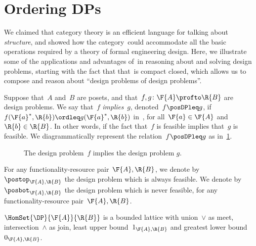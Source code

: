 \section{Ordering DPs}\label{sec:ordering-order}
We claimed that category theory is an efficient language for talking about \emph{structure}, and showed how the category~\DP could accommodate all the basic operations required by a theory of formal engineering design. Here, we illustrate some of the applications and advantages of~\DP in reasoning about and solving design problems, starting with the fact that that~\DP is compact closed, which allows us to compose and reason about ``design problems of design problems''.

\begin{definition}[Order on~\DP]
  \label{def:DP_loc_pos}

  Suppose that~$A$ and~$B$ are posets, and that~$f,g \colon \F{A} \profto \R{B}$ are design problems. We say that~$f$ \emph{implies}~$g$, denoted~$f \posDPleq g$, if~$f(\F{a}^*,\R{b}) \ordleq g(\F{a}^*,\R{b} )$ in~\Bool, for all~$\F{a} \in \F{A}$
  and~$\R{b} \in \R{B}$. In other words, if the fact that~$f$ is feasible implies that~$g$ is feasible. We diagrammatically represent the relation~$f \posDPleq g$ as in~\cref{fig:dpimplies}.
\end{definition}

\begin{figure}[h!]
  \begin{center}
  \end{center}
  \caption{The design problem~$f$ implies the design problem $g$. \label{fig:dpimplies}}
\end{figure}

\begin{remark}
  For any functionality-resource pair~$\F{A},\R{B}$, we denote by~$\postop_{\F{A},\R{B}}$ the design problem which is always feasible. We denote by~$\posbot_{\F{A},\R{B}}$ the design problem which is never feasible, for any functionality-resource pair~$\F{A},\R{B}$.
\end{remark}
\begin{lemma}
  \label{lem:dpboundedlattice}
  $\HomSet{\DP}{\F{A}}{\R{B}}$ is a bounded lattice with union~$\vee$ as meet, intersection~$\wedge$ as join, least upper bound~$1_{\F{A},\R{B}}$ and greatest lower bound~$0_{\F{A},\R{B}}$.
\end{lemma}

